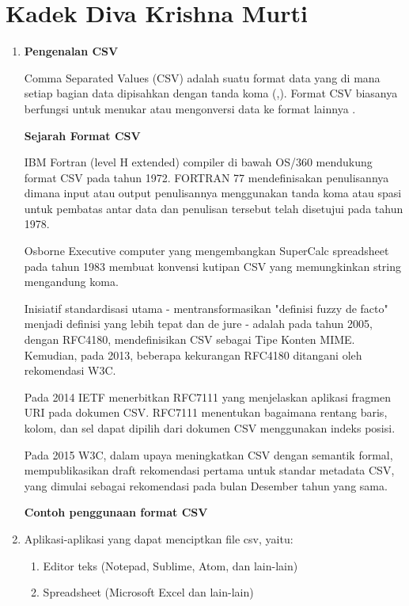\section{Kadek Diva Krishna Murti}

\begin{enumerate}
	\item
	\textbf{Pengenalan CSV}
	
	Comma Separated Values (CSV) adalah suatu format data yang di mana setiap bagian data dipisahkan dengan tanda koma (,). Format CSV biasanya berfungsi untuk menukar atau mengonversi data ke format lainnya \cite{shafranovich2005common}.
	
	\textbf{Sejarah Format CSV}
	
	IBM Fortran (level H extended) compiler di bawah OS/360 mendukung format CSV pada tahun 1972. FORTRAN 77 mendefinisakan penulisannya dimana input atau output penulisannya menggunakan tanda koma atau spasi untuk pembatas antar data dan penulisan tersebut telah disetujui pada tahun 1978.
	
	Osborne Executive computer yang mengembangkan SuperCalc spreadsheet pada tahun 1983 membuat konvensi kutipan CSV yang memungkinkan string mengandung koma.
	
	Inisiatif standardisasi utama - mentransformasikan "definisi fuzzy de facto" menjadi definisi yang lebih tepat dan de jure - adalah pada tahun 2005, dengan RFC4180, mendefinisikan CSV sebagai Tipe Konten MIME. Kemudian, pada 2013, beberapa kekurangan RFC4180 ditangani oleh rekomendasi W3C.
	
	Pada 2014 IETF menerbitkan RFC7111 yang menjelaskan aplikasi fragmen URI pada dokumen CSV. RFC7111 menentukan bagaimana rentang baris, kolom, dan sel dapat dipilih dari dokumen CSV menggunakan indeks posisi.
	
	Pada 2015 W3C, dalam upaya meningkatkan CSV dengan semantik formal, mempublikasikan draft rekomendasi pertama untuk standar metadata CSV, yang dimulai sebagai rekomendasi pada bulan Desember tahun yang sama.
	
	\textbf{Contoh penggunaan format CSV}
	
	
	
	\item Aplikasi-aplikasi yang dapat menciptkan file csv, yaitu:
	\begin{enumerate}
		\item Editor teks (Notepad, Sublime, Atom, dan lain-lain)
		\item Spreadsheet (Microsoft Excel dan lain-lain)
	\end{enumerate}
	

\end{enumerate}
